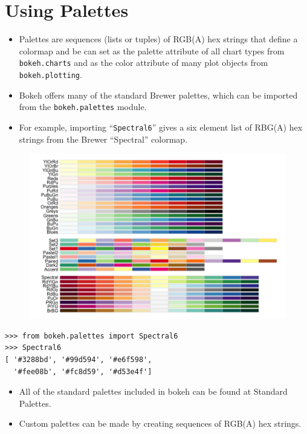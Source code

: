 \documentclass[a4paper,12pt]{article}
\begin{document}
\Large
\section*{Using Palettes}
\begin{itemize}
\item Palettes are sequences (lists or tuples) of RGB(A) hex strings that define a colormap and be can set as the palette attribute of all chart types from \texttt{bokeh.charts} and as the color attribute of many plot objects from \texttt{bokeh.plotting}. 
\item Bokeh offers many of the standard Brewer palettes, which can be imported from the \texttt{bokeh.palettes} module. 
\item For example, importing “\texttt{Spectral6}” gives a six element list of RBG(A) hex strings from the Brewer “Spectral” colormap.
\end{itemize}

\begin{figure}[h!]
\centering
\includegraphics[width=1.2\linewidth]{images/04-pallettes-brewer}

\end{figure}

\newpage

{
	\large
\begin{framed}
\begin{verbatim}
>>> from bokeh.palettes import Spectral6
>>> Spectral6
[ '#3288bd', '#99d594', '#e6f598', 
  '#fee08b', '#fc8d59', '#d53e4f']

\end{verbatim}
\end{framed}
}
\begin{itemize}
\item All of the standard palettes included in bokeh can be found at Standard Palettes.
\item  Custom palettes can be made by creating sequences of RGB(A) hex strings.
\end{itemize}
\end{document}
